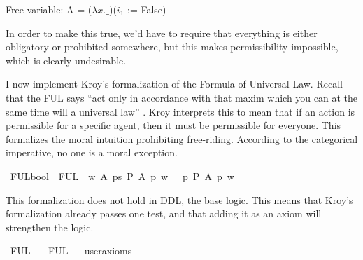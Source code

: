 \begin{isabellebody}
{  Free variable:
    A = ($\lambda x. \_$)($i_1$ := False) \color{black}%
}%
\endisatagproof
{\isafoldproof}%
%
\isadelimproof
%
\endisadelimproof
%
\begin{isamarkuptext}%
In order to make this true, we'd have to require that everything is either obligatory or
prohibited somewhere, but this makes permissibility impossible, which is clearly undesirable.%
\end{isamarkuptext}\isamarkuptrue%
%
\isadelimproof
%
\endisadelimproof
%
\isatagproof
%
\endisatagproof
{\isafoldproof}%
%
\isadelimproof
%
\endisadelimproof
%
\isadelimdocument
%
\endisadelimdocument
%
\isatagdocument
%
\isamarkuptrue%
%
\endisatagdocument
{\isafolddocument}%
%
\isadelimdocument
%
\endisadelimdocument
%
\begin{isamarkuptext}%
I now implement Kroy's formalization of the Formula of Universal Law. Recall that the FUL says
``act only in accordance with that maxim which you can at the same time will a universal law'' \citep{groundwork}.
Kroy interprets this to mean that if an action is permissible for a specific agent, then it must be permissible for everyone.
This formalizes the moral intuition prohibiting free-riding. According to the categorical imperative, 
no one is a moral exception.%
\end{isamarkuptext}\isamarkuptrue%
\isamarkupfalse%
\ FUL{\isacharcolon}{\isacharcolon}{\isachardoublequoteopen}bool{\isachardoublequoteclose}\ \ {\isachardoublequoteopen}FUL\ {\isasymequiv}\ {\isasymforall}w\ A{\isachardot}\ {\isacharparenleft}{\isacharparenleft}{\isasymexists}p{\isacharcolon}{\isacharcolon}s{\isachardot}\ {\isacharparenleft}{\isacharparenleft}P\ {\isacharbraceleft}A\ p{\isacharbraceright}{\isacharparenright}\ w{\isacharparenright}{\isacharparenright}\ \ {\isasymlongrightarrow}{\isacharparenleft}\ {\isacharparenleft}{\isasymforall}p{\isachardot}{\isacharparenleft}\ P\ {\isacharbraceleft}A\ p{\isacharbraceright}{\isacharparenright}\ w{\isacharparenright}{\isacharparenright}{\isacharparenright}\ {\isachardoublequoteclose}\isanewline
%
%
\begin{isamarkuptext}%
This formalization does not hold in DDL, the base logic. This means that Kroy's formalization
already passes one test, and that adding it as an axiom will strengthen the logic.%
\end{isamarkuptext}\isamarkuptrue%
\isamarkupfalse%
\ FUL{\isacharcolon}\isanewline
\ \ \ FUL\isanewline
\ \ \isamarkupfalse%
{\isacharbrackleft}user{\isacharunderscore}axioms{\isacharbrackright}%
\isadelimproof
\ %
\endisadelimproof
%
\isatagproof
{}\isamarkupfalse%
\isanewline
%
\end{isabellebody}
